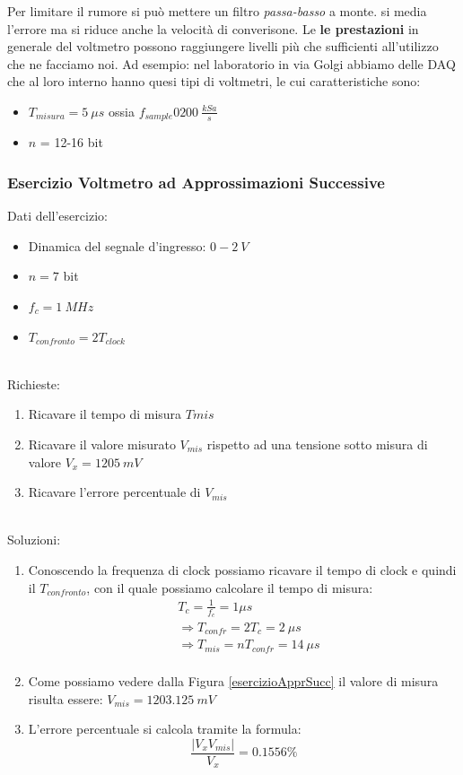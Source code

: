 \documentclass[a4paper,11pt]{report}
\begin{document}
Per limitare il rumore si può mettere un filtro \textit{passa-basso} a monte. si media l'errore ma si riduce anche la velocità di converisone. Le \textbf{le prestazioni} in generale del voltmetro possono raggiungere livelli più che sufficienti all'utilizzo che ne facciamo noi. Ad esempio: nel laboratorio in via Golgi abbiamo delle DAQ che al loro interno hanno quesi tipi di voltmetri, le cui caratteristiche sono:
\begin{itemize}
  \item $ T_{misura} = 5~\mu s $ ossia $ f_{sample} 0 200~\frac{kSa}{s} $
  \item $ n $ = 12-16 bit
\end{itemize}
\newpage
\subsubsection{Esercizio Voltmetro ad Approssimazioni Successive}
Dati dell'esercizio:
\begin{itemize}
  \item Dinamica del segnale d'ingresso: $ 0-2~V $
  \item $ n = 7 $ bit
  \item $ f_{c} = 1~MHz $
  \item $ T_{confronto} = 2T_{clock} $
\end{itemize}~\\
Richieste:
\begin{enumerate}
  \item Ricavare il tempo di misura $ T{mis} $
  \item Ricavare il valore misurato $ V_{mis} $ rispetto ad una tensione sotto misura di valore $ V_x = 1205~mV $
  \item Ricavare l'errore percentuale di $ V_{mis} $ 
\end{enumerate}~\\
Soluzioni:
\begin{enumerate}
  \item Conoscendo la frequenza di clock possiamo ricavare il tempo di clock e quindi il $ T_{confronto} $, con il quale possiamo calcolare il tempo di misura:
  \begin{align*}
    &T_c = \frac{1}{f_c} = 1 \mu s \\
    &\Rightarrow T_{confr} = 2T_c = 2~\mu s \\
    &\Rightarrow T_{mis} = nT_{confr} = 14~\mu s \\
  \end{align*}
  \item Come possiamo vedere dalla Figura \ref{esercizioApprSucc} il valore di misura risulta essere: $ V_{mis} = 1203.125~mV $
  \item L'errore percentuale si calcola tramite la formula:
  $$
    \frac{|V_x  V_{mis}|}{V_x} = 0.1556 \%
  $$
\end{enumerate}
\end{document}
